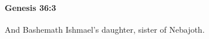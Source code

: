 
		\paragraph{Genesis 36:3} %
			\label{GENESIS-36-3}

			And Bashemath Ishmael's daughter, sister of Nebajoth.


